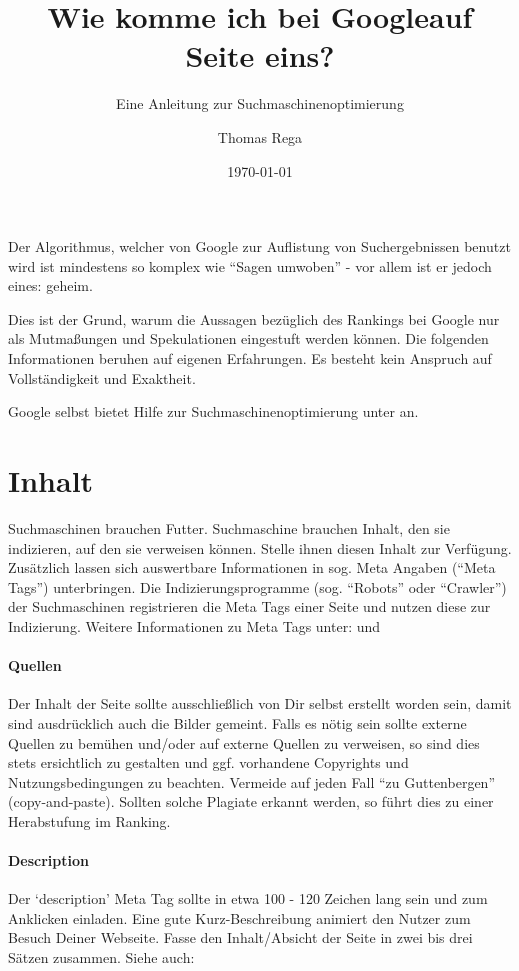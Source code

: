 \documentclass[ngerman, 12pt, a4paper]{scrartcl}
\title{Wie komme ich bei Google\newline auf Seite eins?}
\subtitle{Eine Anleitung zur Suchmaschinenoptimierung}
\author{Thomas Rega}
\date{\today}
\begin{document}
\maketitle

\newpage

Der Algorithmus, welcher von Google zur Auflistung von Suchergebnissen benutzt wird ist mindestens
so komplex wie ``Sagen umwoben'' - vor allem ist er jedoch eines: geheim.
\newline

Dies ist der Grund, warum die Aussagen bezüglich des Rankings bei Google nur als Mutmaßungen und
Spekulationen eingestuft werden können. Die folgenden Informationen beruhen auf eigenen Erfahrungen.
Es besteht kein Anspruch auf Vollständigkeit und Exaktheit.
\newline

Google selbst bietet Hilfe zur Suchmaschinenoptimierung unter \cite{seo} an.

\newpage

\section*{Inhalt}

Suchmaschinen brauchen Futter. Suchmaschine brauchen Inhalt, den sie indizieren, auf den sie
verweisen können. Stelle ihnen diesen Inhalt zur Verfügung. Zusätzlich lassen sich auswertbare
Informationen in sog. Meta Angaben (``Meta Tags'') unterbringen. Die Indizierungsprogramme
(sog. ``Robots'' oder ``Crawler'') der Suchmaschinen registrieren die Meta Tags einer Seite und nutzen
diese zur Indizierung. Weitere Informationen zu Meta Tags unter: \cite{meta_tags} und
\cite{meta_tags_selfhtml}

\paragraph{Quellen}
Der Inhalt der Seite sollte ausschließlich von Dir selbst erstellt worden sein, damit
sind ausdrücklich auch die Bilder gemeint. Falls es nötig sein sollte externe Quellen zu bemühen
und/oder auf externe Quellen zu verweisen, so sind dies stets ersichtlich zu gestalten und ggf.
vorhandene Copyrights und Nutzungsbedingungen zu beachten. Vermeide auf jeden Fall ``zu Guttenbergen''
(copy-and-paste). Sollten solche Plagiate erkannt werden, so führt dies zu einer Herabstufung im Ranking.

\paragraph{Description}
Der `description' Meta Tag sollte in etwa 100 - 120 Zeichen lang sein und zum Anklicken einladen.
Eine gute Kurz-Beschreibung animiert den Nutzer zum Besuch Deiner Webseite. Fasse den Inhalt/Absicht
der Seite in zwei bis drei Sätzen zusammen.
\newline Siehe auch: \cite{meta_tags}
\end{document}
